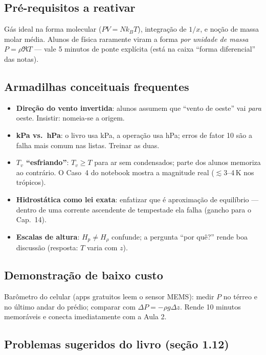 \subsection*{Pré-requisitos a reativar}

Gás ideal na forma molecular ($PV=Nk_BT$), integração de $1/x$, e noção de
massa molar média. Alunos de física raramente viram a forma
\emph{por unidade de massa} $P=\rho\Re T$ — vale 5 minutos de ponte explícita
(está na caixa ``forma diferencial'' das notas).

\subsection*{Armadilhas conceituais frequentes}

\begin{itemize}
  \item \textbf{Direção do vento invertida}: alunos assumem que ``vento de
        oeste'' vai \emph{para} oeste. Insistir: nomeia-se a origem.
  \item \textbf{kPa vs.\ hPa}: o livro usa kPa, a operação usa hPa; erros de
        fator 10 são a falha mais comum nas listas. Treinar as duas.
  \item \textbf{$T_v$ ``esfriando''}: $T_v \ge T$ para ar sem condensados;
        parte dos alunos memoriza ao contrário. O Caso~4 do notebook mostra a
        magnitude real ($\lesssim 3$--4\,K nos trópicos).
  \item \textbf{Hidrostática como lei exata}: enfatizar que é aproximação de
        equilíbrio — dentro de uma corrente ascendente de tempestade ela
        falha (gancho para o Cap.~14).
  \item \textbf{Escalas de altura}: $H_p \ne H_\rho$ confunde; a pergunta
        ``por quê?'' rende boa discussão (resposta: $T$ varia com $z$).
\end{itemize}

\subsection*{Demonstração de baixo custo}

Barômetro do celular (apps gratuitos leem o sensor MEMS): medir $P$ no térreo
e no último andar do prédio; comparar com $\Delta P=-\rho g \Delta z$.
Rende 10 minutos memoráveis e conecta imediatamente com a Aula 2.

\subsection*{Problemas sugeridos do livro (seção 1.12)}


